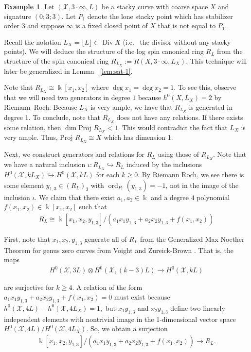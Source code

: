 \documentclass{amsart}
\theoremstyle{plain}
\theoremstyle{definition}
\newtheorem{example}[thm]{Example}
\theoremstyle{remark}
\numberwithin{equation}{section}
\newcommand\Bk{{\Bbbk}}
\newcommand\proj{\text{Proj }}
\DeclareMathOperator{\ord}{ord}
\DeclareMathOperator\di{Div}
\newcommand\sx{\mathscr X}
\newcommand{\halfcan}{L}
\begin{document}
\begin{example}
\label{eg:adding-point}
Let $(\sx,3 \cdot \infty, L)$ be a stacky curve with coarse space $X$ and signature 
$(0; 3; 3)$. Let $P_1$ denote the lone stacky point which has stabilizer
order $3$ and suppose $\infty$ is a fixed closed point of $X$ that is
not equal to $P_1$.

Recall the notation $\halfcan_X = \lfloor L \rfloor \in \di X$
(i.e.~ the divisor without any stacky points). We will deduce the
structure of the log spin canonical ring $R_\halfcan$ from the
structure of the spin canonical ring $R_{\halfcan_X} := R(X, 3 \cdot
 \infty, \halfcan_X)$. This technique will later be generalized in
Lemma ~\ref{lem:sat-1}.

Note that $R_{\halfcan_X} \cong \Bk[x_1, x_2]$ where $\deg x_1 = \deg x_2 = 1.
$ To see this, observe that we will need two generators in degree $1$
because $h^0(X, \halfcan_X) = 2$ by Riemann--Roch. Because $\halfcan_X$ is very 
ample, we have that $R_{\halfcan_X}$ is generated in degree 1. To
conclude, note that $R_{\halfcan_X}$ does not have any relations. If there
exists some relation, then $\dim \proj R_{\halfcan_X} < 1$. This would
contradict the fact that $\halfcan_X$ is very ample. Thus, $\proj R_{\halfcan_X}
\cong X$ which has dimension 1.

Next, we construct generators and relations for $R_\halfcan$ using those
of $R_{\halfcan_X}$. Note that we have a natural inclusion $\iota: R_{\halfcan_X}
\hookrightarrow R_\halfcan$ induced by the inclusions $H^0(\sx, k\halfcan_X)
\hookrightarrow H^0(\sx, k\halfcan)$ for each $k \geq 0$. By Riemann Roch,
we see there is some element $y_{1, 3} \in (R_\halfcan)_3$ with $\ord_{P_1}
(y_{1, 3}) = -1$, not in the image of the inclusion $\iota$. We
claim that there exist $a_1, a_2 \in \Bk$ and a degree $4$ polynomial
$f(x_1, x_2) \in \Bk[x_1, x_2]$ such that
\begin{align*}
	R_\halfcan \cong \Bk[x_1, x_2, y_{1, 3}] / (a_1 x_1 y_{1, 3} + a_2 x_2 y_{1, 3}
	+ f(x_1,x_2))
\end{align*}

First, note that $x_1, x_2, y_{1, 3}$ generate all of $R_\halfcan$ from the
Generalized Max Noether Theorem for genus zero curves from Voight
and Zureick-Brown \cite[Lemma 3.1.1]{vzb:stacky}. That is, the maps
\begin{align*}
	H^0(\sx, 3L) \otimes H^0(\sx, (k - 3)L) \rightarrow H^0(\sx, k\halfcan)
\end{align*}

\noindent
are surjective for $k \geq 4$. A relation of the form $a_1 x_1 y_{1,
3} + a_2 x_2 y_{1, 3} + f(x_1, x_2) = 0$ must exist because $h^0(\sx,
4L) - h^0(\sx, 4\halfcan_X) = 1,$ but $x_1 y_{1, 3}$ and $x_2 y_{1, 3}$
define two linearly independent elements with nontrivial image in
the 1-dimensional vector space $H^0(\sx, 4L) / H^0(\sx, 4\halfcan_X).$ So,
we obtain a surjection
\begin{align}
\label{align:surjection}
	\Bk[x_1, x_2, y_{1, 3}] / (a_1 x_1 y_{1, 3} + a_2 x_2 y_{1, 3} + f(x_1, x_2)) 
	\rightarrow R_\halfcan.
\end{align}


\end{example}
\end{document}
